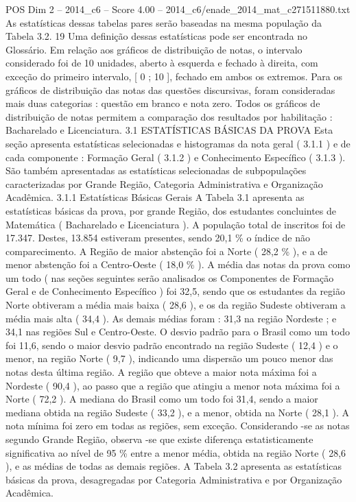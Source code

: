 \begin{textsample}{POS Dim 2 – 2014\_c6 – Score 4.00 – 2014\_c6/enade\_2014\_mat\_c271511880.txt}
As estatísticas dessas tabelas pares serão baseadas na mesma população da Tabela 3.2. 19 Uma definição dessas estatísticas pode ser encontrada no Glossário.
Em relação aos gráficos de distribuição de notas, o intervalo considerado foi de 10 unidades, aberto à esquerda e fechado à direita, com exceção do primeiro intervalo, [ 0 ; 10 ], fechado em ambos os extremos.
Para os gráficos de distribuição das notas das questões discursivas, foram consideradas mais duas categorias : questão em branco e nota zero.
Todos os gráficos de distribuição de notas permitem a comparação dos resultados por habilitação : Bacharelado e Licenciatura. 3.1 ESTATÍSTICAS BÁSICAS DA PROVA Esta seção apresenta estatísticas selecionadas e histogramas da nota geral ( 3.1.1 ) e de cada componente : Formação Geral ( 3.1.2 ) e Conhecimento Específico ( 3.1.3 ).
São também apresentadas as estatísticas selecionadas de subpopulações caracterizadas por Grande Região, Categoria Administrativa e Organização Acadêmica. 3.1.1 Estatísticas Básicas Gerais A Tabela 3.1 apresenta as estatísticas básicas da prova, por grande Região, dos estudantes concluintes de Matemática ( Bacharelado e Licenciatura ).
A população total de inscritos foi de 17.347.
Destes, 13.854 estiveram presentes, sendo 20,1 \% o índice de não comparecimento.
A Região de maior abstenção foi a Norte ( 28,2 \% ), e a de menor abstenção foi a Centro-Oeste ( 18,0 \% ).
A média das notas da prova como um todo ( nas seções seguintes serão analisados os Componentes de Formação Geral e de Conhecimento Específico ) foi 32,5, sendo que os estudantes da região Norte obtiveram a média mais baixa ( 28,6 ), e os da região Sudeste obtiveram a média mais alta ( 34,4 ).
As demais médias foram : 31,3 na região Nordeste ; e 34,1 nas regiões Sul e Centro-Oeste.
O desvio padrão para o Brasil como um todo foi 11,6, sendo o maior desvio padrão encontrado na região Sudeste ( 12,4 ) e o menor, na região Norte ( 9,7 ), indicando uma dispersão um pouco menor das notas desta última região.
A região que obteve a maior nota máxima foi a Nordeste ( 90,4 ), ao passo que a região que atingiu a menor nota máxima foi a Norte ( 72,2 ).
A mediana do Brasil como um todo foi 31,4, sendo a maior mediana obtida na região Sudeste ( 33,2 ), e a menor, obtida na Norte ( 28,1 ).
A nota mínima foi zero em todas as regiões, sem exceção.
Considerando -se as notas segundo Grande Região, observa -se que existe diferença estatisticamente significativa ao nível de 95 \% entre a menor média, obtida na região Norte ( 28,6 ), e as médias de todas as demais regiões.
A Tabela 3.2 apresenta as estatísticas básicas da prova, desagregadas por Categoria Administrativa e por Organização Acadêmica.

\end{textsample}
